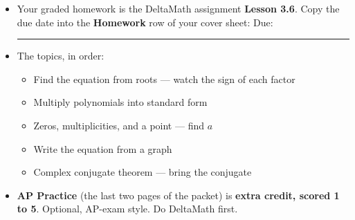 \documentclass[aspectratio=169, 11pt]{beamer}
\begin{document}
\begin{frame}[t, plain]

  \begin{itemize}\setlength{\itemsep}{8pt}
    \item Your graded homework is the DeltaMath assignment \textbf{Lesson 3.6}.
          Copy the due date into the \textbf{Homework} row of your cover sheet:
          \quad Due: \rule{3cm}{0.4pt}
    \item The topics, in order:
          \begin{itemize}\setlength{\itemsep}{2pt}
            \item Find the equation from roots --- watch the sign of each factor
            \item Multiply polynomials into standard form
            \item Zeros, multiplicities, and a point --- find \(a\)
            \item Write the equation from a graph
            \item Complex conjugate theorem --- bring the conjugate
          \end{itemize}
    \item \textbf{AP Practice} (the last two pages of the packet) is
          \textbf{extra credit, scored 1 to 5}. Optional, AP-exam style. Do DeltaMath first.
  \end{itemize}
\end{frame}
\end{document}
